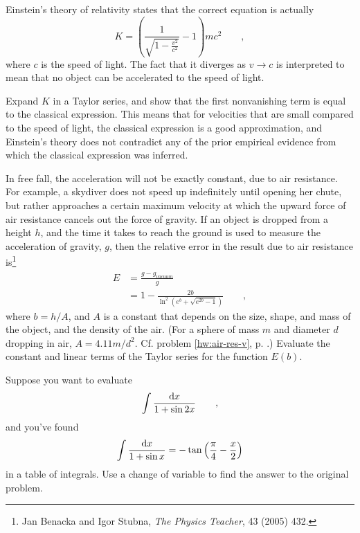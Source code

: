 \begin{hwsection}
\begin{hw}
Einstein's theory of relativity states that the correct equation is actually
\begin{equation*}
  K = \left(\frac{1}{\sqrt{1-\frac{v^2}{c^2}}}-1\right)mc^2 \qquad ,
\end{equation*}
where $c$ is the speed of light. The fact that it diverges as $v \rightarrow c$ is interpreted
to mean that no object can be accelerated to the speed of light.

Expand $K$ in a Taylor series, and show that the first
nonvanishing term is equal to the classical expression. This means that for velocities that
are small compared to the speed of light, the classical expression is a good approximation,
and Einstein's theory does not contradict any of the prior empirical evidence from which
the classical expression was inferred.
\end{hw}

\pagebreak

\begin{hw}\label{hw:air-res-taylor}
In free fall, the acceleration will not be exactly constant, due to air resistance. For example,
a skydiver does not speed up indefinitely until opening her chute, but rather approaches a certain
maximum velocity at which the upward force of air resistance cancels out the force of gravity.
If an object is dropped from a height $h$, and the time it takes to reach the ground is used to
measure the acceleration of gravity, $g$, then the relative error in the result due to air
resistance is\footnote{Jan Benacka
and Igor Stubna, \emph{The Physics Teacher}, 43 (2005) 432.}
\begin{align*}
  E &= \frac{g-g_{vacuum}}{g} \\
   & = 1-\frac{2b}{\ln^2\left(e^b+\sqrt{e^{2b}-1}\right)} \qquad ,
\end{align*}
where $b=h/A$, and
$A$ is a constant that depends on the size, shape, and mass of the object, and the density of
the air.   (For a sphere of mass $m$ and diameter $d$ dropping in air, $A=4.11m/d^2$. Cf. problem \ref{hw:air-res-v}, p. \pageref{hw:air-res-v}.)
Evaluate the constant and linear terms of the Taylor series for the function $E(b)$.
\end{hw}

\begin{hw}
Suppose you want to evaluate
\begin{equation*}
  \int \frac{\textup{d} x}{1+\sin 2x} \qquad ,
\end{equation*}
and you've found
\begin{equation*}
  \int \frac{\textup{d} x}{1+\sin x} = -\tan\left(\frac{\pi}{4}-\frac{x}{2}\right)
\end{equation*}
in a table of integrals. Use a change of variable to find the answer to the
original problem.
\end{hw}


\end{hwsection}
